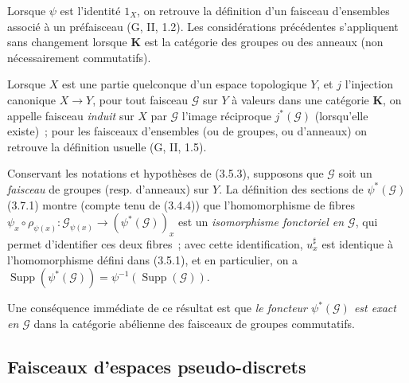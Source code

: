 \begin{env}[3.7.1]
Lorsque $\psi$ est l'identité $1_X$, on retrouve la définition d'un faisceau
d'ensembles associé à un préfaisceau (G, II, 1.2). Les considérations
précédentes s'appliquent sans changement lorsque $\mathbf{K}$ est la
catégorie des groupes ou des anneaux (non nécessairement commutatifs).

Lorsque $X$ est une partie quelconque d'un espace topologique $Y$, et $j$
l'injection canonique $X\to Y$, pour tout faisceau $\mathcal{G}$ sur $Y$ à
valeurs dans une catégorie $\mathbf{K}$, on appelle faisceau \emph{induit} sur
$X$ par $\mathcal{G}$ l'image réciproque $j^*(\mathcal{G})$ (lorsqu'elle
existe)~; pour les faisceaux d'ensembles (ou de groupes, ou d'anneaux) on
retrouve la définition usuelle (G, II, 1.5).
\end{env}

\begin{env}[3.7.2]
\label{0.3.7.2-fr}
Conservant les notations et hypothèses de (3.5.3), supposons que
$\mathcal{G}$ soit un \emph{faisceau} de groupes (resp. d'anneaux) sur $Y$.
La définition des sections de $\psi^*(\mathcal{G})$ (3.7.1) montre (compte
tenu de (3.4.4)) que l'homomorphisme de fibres
$\psi_x\circ\rho_{\psi(x)}:\mathcal{G}_{\psi(x)}\to
(\psi^*(\mathcal{G}))_x$ est un \emph{isomorphisme fonctoriel en
$\mathcal{G}$}, qui permet d'identifier ces deux fibres~; avec cette
identification, $u_x^\sharp$ est identique à l'homomorphisme défini dans
(3.5.1), et en particulier, on a
$\operatorname{Supp}(\psi^*(\mathcal{G}))=
\psi^{-1}(\operatorname{Supp}(\mathcal{G}))$.

Une conséquence immédiate de ce résultat est que \emph{le foncteur
$\psi^*(\mathcal{G})$ est exact en $\mathcal{G}$} dans la catégorie abélienne
des faisceaux de groupes commutatifs.
\end{env}

\subsection{Faisceaux d'espaces pseudo-discrets}


